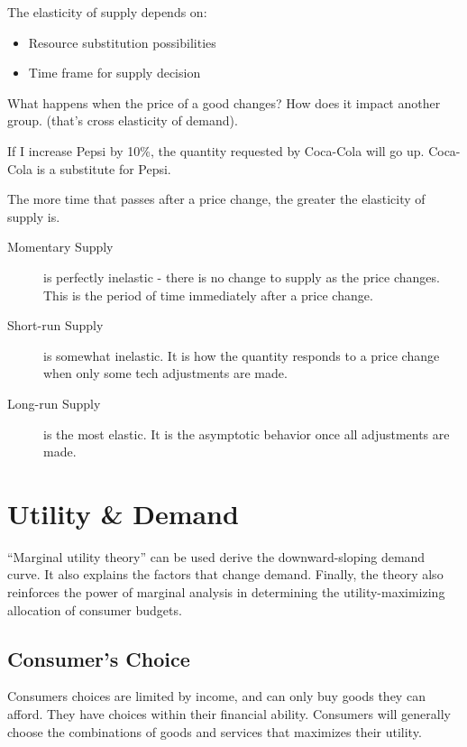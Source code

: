                The elasticity of supply depends on:
                \begin{itemize}
                    \item Resource substitution possibilities
                    \item Time frame for supply decision
                \end{itemize}

                What happens when the price of a good changes?
                How does it impact another group.
                (that's cross elasticity of demand).

                If I increase Pepsi by 10\%, the quantity requested by Coca-Cola will go up.
                Coca-Cola is a substitute for Pepsi.

                The more time that passes after a price change, the greater the elasticity of supply is.
                \begin{description}
                    \item[Momentary Supply] is perfectly inelastic - there is no change to supply as the price changes.
                        This is the period of time immediately after a price change.
                    \item[Short-run Supply] is somewhat inelastic.
                        It is how the quantity responds to a price change when only some tech adjustments are made.
                    \item[Long-run Supply] is the most elastic.
                        It is the asymptotic behavior once all adjustments are made.
                \end{description}

        \setcounter{chapter}{7}
        \chapter{Utility \& Demand} %
        \label{cha:utility_&_demand}

            ``Marginal utility theory'' can be used derive the downward-sloping demand curve.
            It also explains the factors that change demand.
            Finally, the theory also reinforces the power of marginal analysis in determining the utility-maximizing allocation of consumer budgets.

            \section{Consumer's Choice} %
            \label{sec:consumer_s_choice}
                Consumers choices are limited by income, and can only buy goods they can afford.
                They have choices within their financial ability.
                Consumers will generally choose the combinations of goods and services that maximizes their utility.

